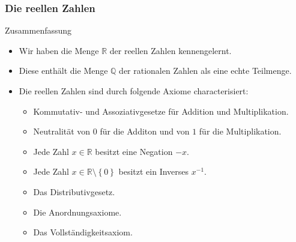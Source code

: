 \documentclass{beamer}
\newcommand\QQ{\mathbb Q}
\newcommand\RR{\mathbb R}
\newcommand\cbc[1]{\left\{{#1}\right\}}
\renewcommand{\ae}{\"a}
\newcommand{\ue}{\"u}
\newcommand{\mytitle}{Die reellen Zahlen}
\begin{document}
\begin{frame}\frametitle{\mytitle}
	\begin{block}{Zusammenfassung}
	\begin{itemize}
		\item Wir haben die Menge $\RR$ der reellen Zahlen kennengelernt.
		\item Diese enth\ae lt die Menge $\QQ$ der rationalen Zahlen als eine echte Teilmenge.
		\item Die reellen Zahlen sind durch folgende Axiome characterisiert:
		\begin{itemize}
		\item Kommutativ- und Assoziativgesetze f\ue r Addition und Multiplikation.
		\item Neutralit\ae t von $0$ f\ue r die Additon und von $1$ f\ue r die Multiplikation.
		\item Jede Zahl $x\in\RR$ besitzt eine Negation $-x$.
		\item Jede Zahl $x\in\RR\setminus\cbc0$ besitzt ein Inverses $x^{-1}$.
		\item Das Distributivgesetz.
		\item Die Anordnungsaxiome.
		\item Das Vollst\ae ndigkeitsaxiom.
		\end{itemize}
	\end{itemize}
	\end{block}
\end{frame}
\end{document}
